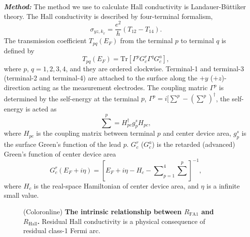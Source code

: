 \documentclass[twocolumn,superscriptaddress]{revtex4}%
\begin{document}
\textbf{\emph{Method:}} The method we use to calculate Hall conductivity is Landauer-B\"{u}ttiker theory. The Hall conductivity is described by four-terminal formalism\cite{ButtikerM1986, ShenSQ2005},
\begin{equation}
\sigma_{yz,k_{x}}=\frac{e^{2}}{h}(T_{12}-T_{14}).
\end{equation}
The transmission coefficient $T_{pq}(E_{F})$ from the terminal $p$ to terminal
$q$ is defined by
\begin{equation}
T_{pq}(E_{F})=\mathrm{Tr}[\Gamma^{p}G_{c}^{r}\Gamma^{q}G_{c}^{a}],
\end{equation}
where $p$, $q=1,2,3,4$, and they are ordered clockwise. Terminal-1 and
terminal-3 (terminal-2 and terminal-4) are attached to the surface along the
$+y$ ($+z$)-direction acting as the measurement electrodes. The coupling
matric $\Gamma^{p}$ is determined by the self-energy at the terminal $p$,
$\Gamma^{p}=i[\sum^{p}-(\sum^{p})^{\dagger}$, the self-energy is acted as
\begin{equation}
\sum^{p}=H_{pc}^{\dag}g_{p}^{s}H_{pc},
\end{equation}
where $H_{pc}$ is the coupling matrix between terminal $p$ and center device
area, $g_{p}^{s}$ is the surface Green's function of the lead $p$. $G_{c}^{r}$ ($G_{c}^{a}$) is the
retarded (advanced) Green's function of center device area
\begin{equation}
G_{c}^{r}(E_{F}+i\eta)=[E_{F}+i\eta-H_{c}-\sum \nolimits_{p=1}^{4}\sum
^{p}]^{-1},
\end{equation}
where $H_{c}$ is the real-space Hamiltonian of center device area, and $\eta$
is a infinite small value.
\begin{figure}[t]
\caption{(Coloronline) \textbf{The intrinsic relationship between
$R_{\mathrm{FA1}}$ and $R_{\mathrm{Hall}}$.} Residual Hall conductivity is a
physical consequence of residual class-1 Fermi arc.}%
\label{RfaRhall}%
\end{figure}
\end{document}
